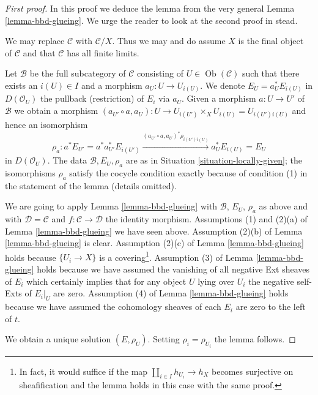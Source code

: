 \documentclass{stacks-project}
\theoremstyle{plain}
\theoremstyle{definition}
\theoremstyle{remark}
\numberwithin{equation}{subsection}
\def\Ob{\mathop{\mathrm{Ob}}\nolimits}
\begin{document}
\begin{proof}[First proof]
In this proof we deduce the lemma from the very general
Lemma \ref{lemma-bbd-glueing}. We urge the reader to look
at the second proof in stead.

\medskip\noindent
We may replace $\mathcal{C}$ with $\mathcal{C}/X$.
Thus we may and do assume $X$ is the final object of $\mathcal{C}$
and that $\mathcal{C}$ has all finite limits.

\medskip\noindent
Let $\mathcal{B}$ be the full subcategory of $\mathcal{C}$
consisting of $U \in \Ob(\mathcal{C})$ such that there exists
an $i(U) \in I$ and a morphism $a_U : U \to U_{i(U)}$.
We denote $E_U = a_U^*E_{i(U)}$ in $D(\mathcal{O}_U)$
the pullback (restriction) of $E_i$ via $a_U$.
Given a morphism $a : U \to U'$ of $\mathcal{B}$
we obtain a morphism
$(a_{U'} \circ a, a_U) : U \to U_{i(U')} \times_X U_{i(U)} = U_{i(U')i(U)}$
and hence an isomorphism
$$
\rho_a :
a^*E_{U'} = a^*a_{U'}^*E_{i(U')}
\xrightarrow{(a_{U'} \circ a, a_U)^*\rho_{i(U')i(U)}}
a_{U}^*E_{i(U)} = E_{U}
$$
in $D(\mathcal{O}_U)$. The data $\mathcal{B}, E_U, \rho_a$
are as in Situation \ref{situation-locally-given}; the
isomorphisms $\rho_a$ satisfy the cocycle condition
exactly because of condition (1) in the statement of the lemma
(details omitted).

\medskip\noindent
We are going to apply Lemma \ref{lemma-bbd-glueing} with $\mathcal{B}$,
$E_U$, $\rho_a$ as above and with $\mathcal{D} = \mathcal{C}$ and
$f : \mathcal{C} \to \mathcal{D}$ the identity morphism.
Assumptions (1) and (2)(a) of Lemma \ref{lemma-bbd-glueing} we have seen above.
Assumption (2)(b) of Lemma \ref{lemma-bbd-glueing} is clear.
Assumption (2)(c) of Lemma \ref{lemma-bbd-glueing} holds because
$\{U_i \to X\}$ is a covering\footnote{In fact, it would suffice
if the map $\coprod_{i \in I} h_{U_i} \to h_X$ becomes
surjective on sheafification and the lemma holds in this case
with the same proof.}.
Assumption (3) of Lemma \ref{lemma-bbd-glueing} holds
because we have assumed the vanishing of all negative Ext sheaves
of $E_i$ which certainly implies that for any object $U$ lying over $U_i$
the negative self-Exts of $E_i|_U$ are zero.
Assumption (4) of Lemma \ref{lemma-bbd-glueing} holds because
we have assumed the cohomology sheaves of each $E_i$ are zero
to the left of $t$.

\medskip\noindent
We obtain a unique solution $(E, \rho_U)$.
Setting $\rho_i = \rho_{U_i}$ the lemma follows.
\end{proof}
\end{document}
